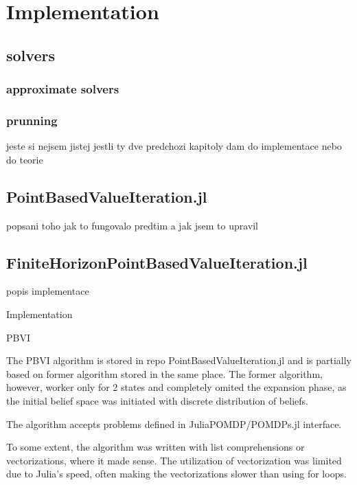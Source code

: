 
\chapter{Implementation}


\section{solvers}

\subsection{approximate solvers}

\subsection{prunning}

jeste si nejsem jistej jestli ty dve predchozi kapitoly dam do implementace nebo do teorie

\section{PointBasedValueIteration.jl}
popsani toho jak to fungovalo predtim a jak jsem to upravil

\section{FiniteHorizonPointBasedValueIteration.jl}
popis implementace







Implementation

PBVI

The PBVI algorithm is stored in repo PointBasedValueIteration.jl and is partially based on former algorithm stored in the same place. The former algorithm, however, worker only for 2 states and completely omited the expansion phase, as the initial belief space was initiated with discrete distribution of beliefs.


The algorithm accepts problems defined in JuliaPOMDP/POMDPs.jl interface.



To some extent, the algorithm was written with list comprehensions or vectorizations, where it made sense. The utilization of vectorization was limited due to Julia's speed, often making the vectorizations slower than using for loops.




